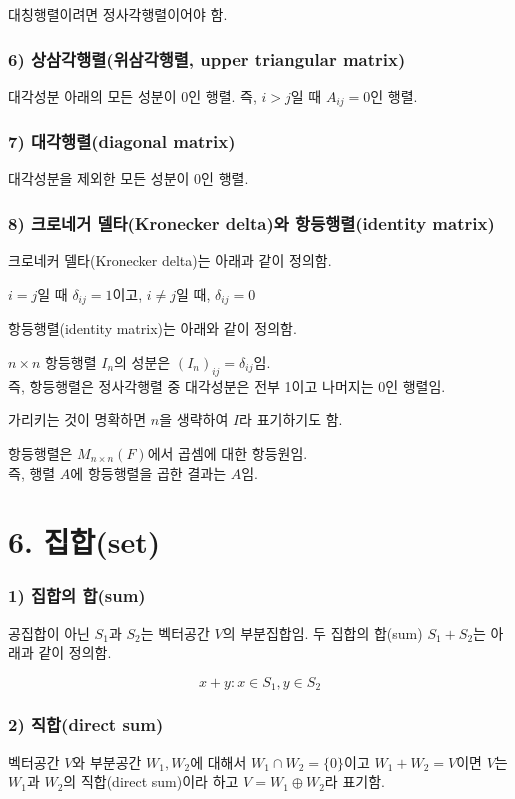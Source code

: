 대칭행렬이려면 정사각행렬이어야 함.

\subsubsection*{6) 상삼각행렬(위삼각행렬, upper triangular matrix)\\}
\begin{DEF}
대각성분 아래의 모든 성분이 0인 행렬. 즉, $i>j$일 때 $A_{ij}=0$인 행렬.
\end{DEF}

\subsubsection*{7) 대각행렬(diagonal matrix)\\}
\begin{DEF}
대각성분을 제외한 모든 성분이 0인 행렬.
\end{DEF}


\newpage


\subsubsection*{8) 크로네거 델타(Kronecker delta)와 항등행렬(identity matrix)}
크로네커 델타(Kronecker delta)는 아래과 같이 정의함.\\

\begin{DEF}
$i=j$일 때 $\delta_{ij}=1$이고, $i \neq j$일 때, $\delta_{ij}=0$
\end{DEF}

항등행렬(identity matrix)는 아래와 같이 정의함.\\

\begin{DEF}
$n \times n$ 항등행렬 $I_n$의 성분은 $(I_n)_{ij}=\delta_{ij}$임.\\
즉, 항등행렬은 정사각행렬 중 대각성분은 전부 1이고 나머지는 0인 행렬임.
\end{DEF}

가리키는 것이 명확하면 $n$을 생략하여 $I$라 표기하기도 함.

항등행렬은 $M_{n \times n}(F)$에서 곱셈에 대한 항등원임.\\
즉, 행렬 $A$에 항등행렬을 곱한 결과는 $A$임.\\


\section*{6. 집합(set)}
\subsubsection*{1) 집합의 합(sum)\\}
\begin{DEF}
공집합이 아닌 $S_1$과 $S_2$는 벡터공간 $V$의 부분집합임. 두 집합의 합(sum) $S_1 + S_2$는 아래과 같이 정의함.

\[
{x+y:x \in S_1,y \in S_2}
\]
\end{DEF}

\subsubsection*{2) 직합(direct sum)\\}
\begin{DEF}
벡터공간 $V$와 부분공간 $W_1,W_2$에 대해서 $W_1 \cap W_2 =\{0\}$이고 $W_1 + W_2=V$이면 $V$는 $W_1$과 $W_2$의 직합(direct sum)이라 하고 $V=W_1 \oplus W_2$라 표기함.
\end{DEF}
